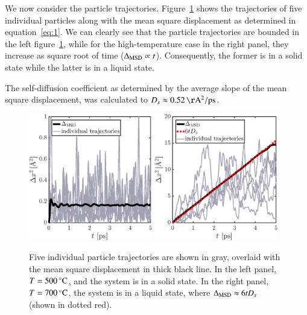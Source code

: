 We now consider the particle trajectories. Figure~\ref{fig:MSD} shows the trajectories of five individual particles along with the mean square displacement as determined in equation~\eqref{eq:1}. We can clearly see that the particle trajectories are bounded in the left figure~\ref{fig:MSD}, while for the high-temperature case in the right panel, they increase as square root of time ($\Delta_{\rm MSD} \propto t$). Consequently, the former is in a solid state while the latter is in a liquid state. 

The self-diffusion coefficient as determined by the average slope of the mean square displacement, was calculated to $D_s \approx \unit[0.52]{\AA^2/ps}$.  

\begin{figure}[!ht]
\begin{center}
  \includegraphics[width=0.48\textwidth]{../figures/MSD-500} 
    \includegraphics[width=0.48\textwidth]{../figures/MSD-700} 
  \caption{Five individual particle trajectories are shown in gray, overlaid with the mean square displacement in thick black line. In the left panel, $T=\unit[500]{^\circ C}$, and the system is in a solid state. In the right panel, $T=\unit[700]{^\circ C}$, the system is in a liquid state, where $\Delta_{\rm MSD} \approx 6 t D_s$ (shown in dotted red).}
  \label{fig:MSD}
\end{center}
\end{figure}





